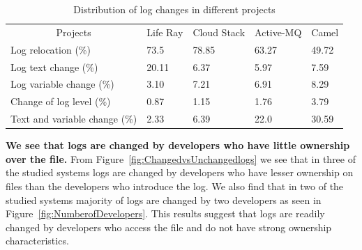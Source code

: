 \begin{table}[t]
	\centering
	\caption{Distribution of log changes in different projects}
	\label{tba:logtype}
	\begin{tabular}{l|llll}
		\cline{1-5}  	\multicolumn{1}{|c}{Projects}    & \multicolumn{1}{|c}{ Life Ray }  &  \multicolumn{1}{|c}{ Cloud Stack}	   &  \multicolumn{1}{|c}{ Active-MQ }  & 
		 \multicolumn{1}{|c|}{ Camel } \\ \cline{1-5}   
		
		Log relocation (\%)       & 73.5     & 78.85 &  63.27  & 49.72         \\
		
		Log text change (\%)      & 20.11    & 6.37 & 5.97    & 7.59       \\
		Log variable change (\%)   & 3.10     & 7.21 & 6.91 &  8.29     \\
		Change of log level (\%) & 0.87   & 1.15 & 1.76  &  3.79       \\ 
		Text and variable change (\%) & 2.33     & 6.39 & 22.0   &  30.59    \\ \cline{1-5}
	\end{tabular}
\end{table}

\textbf{We see that logs are changed by developers who have little ownership over the file.} From Figure~\ref{fig:ChangedvsUnchangedlogs} we see that in three of the studied systems logs are changed by developers who have lesser ownership on files than the developers who introduce the log. We also find that in two of the studied systems majority of logs are changed by two developers as seen in Figure~\ref{fig:NumberofDevelopers}. This results suggest that logs are readily changed by developers who access the file and do not have strong ownership characteristics.




